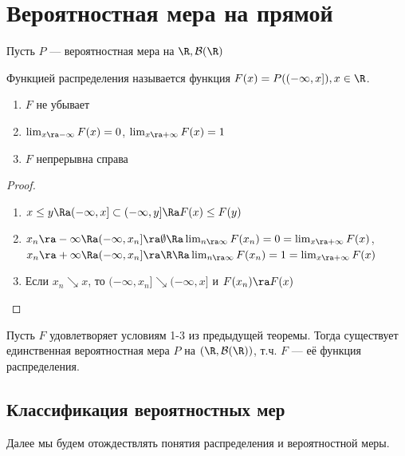 \section{Вероятностная мера на прямой}
Пусть \(P\) --- вероятностная мера на \(\R, \mathcal{B}(\R)\)
\begin{definition}
    Функцией распределения называется функция \(F(x) = P((-\infty, x]), x \in \R\).
\end{definition}

\begin{lemma}
    \indent
    \begin{enumerate}
        \item \(F\) не убывает
        \item \(\lim_{x \ra -\infty} F(x) = 0\), \(\lim_{x \ra +\infty} F(x) = 1\)
        \item \(F\) непрерывна справа
    \end{enumerate}
\end{lemma}
\begin{proof}
    \indent
    \begin{enumerate}
        \item \(x \le y \Ra (-\infty, x] \subset (-\infty, y] \Ra F(x) \le F(y)\)
        \item \(x_n \ra -\infty \Ra (-\infty, x_n] \ra \emptyset \Ra \lim_{n \ra \infty} F(x_n) = 0 = \lim_{x \ra +\infty} F(x)\), \(x_n \ra +\infty \Ra (-\infty, x_n] \ra \R \Ra \lim_{n \ra \infty} F(x_n) = 1 = \lim_{x \ra +\infty} F(x)\)
        \item Если \(x_n \searrow x\), то \((-\infty, x_n] \searrow (-\infty, x]\) и \(F(x_n) \ra F(x)\)
    \end{enumerate}
\end{proof}

\begin{theorem}
    Пусть \(F\) удовлетворяет условиям 1-3 из предыдущей теоремы. Тогда существует единственная вероятностная мера \(P\) на \((\R, \mathcal{B}(\R))\), т.ч. \(F\) --- её функция распределения.
\end{theorem}

\subsection{Классификация вероятностных мер}

Далее мы будем отождествлять понятия распределения и вероятностной меры.

